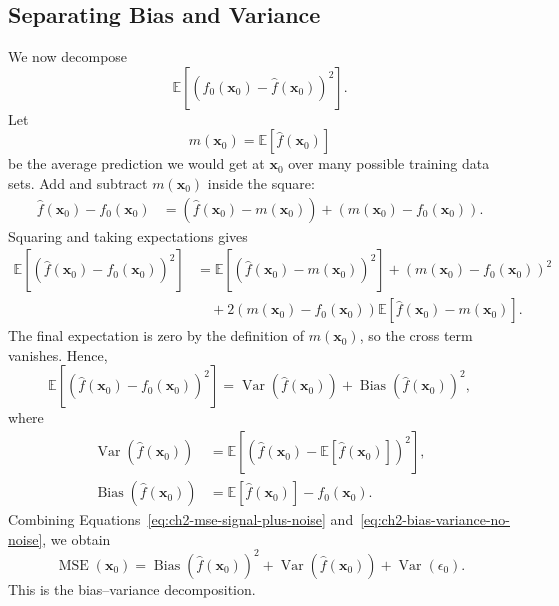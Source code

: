 {\subsection{Separating Bias and Variance}

We now decompose
\[
  \mathbb{E}\left[\left(f_0(\mathbf{x}_0)-\hat f(\mathbf{x}_0)\right)^2\right].
\]
Let
\[
  m(\mathbf{x}_0)=\mathbb{E}\left[\hat f(\mathbf{x}_0)\right]
\]
be the average prediction we would get at $\mathbf{x}_0$ over many possible training data sets.  Add and subtract $m(\mathbf{x}_0)$ inside the square:
\begin{align*}
  \hat f(\mathbf{x}_0)-f_0(\mathbf{x}_0)
  &= \left(\hat f(\mathbf{x}_0)-m(\mathbf{x}_0)\right)
  + \left(m(\mathbf{x}_0)-f_0(\mathbf{x}_0)\right).
\end{align*}
Squaring and taking expectations gives
\begin{align*}
  \mathbb{E}\left[\left(\hat f(\mathbf{x}_0)-f_0(\mathbf{x}_0)\right)^2\right]
  &= \mathbb{E}\left[\left(\hat f(\mathbf{x}_0)-m(\mathbf{x}_0)\right)^2\right]
  + \left(m(\mathbf{x}_0)-f_0(\mathbf{x}_0)\right)^2 \\
  &\quad + 2\left(m(\mathbf{x}_0)-f_0(\mathbf{x}_0)\right)
  \mathbb{E}\left[\hat f(\mathbf{x}_0)-m(\mathbf{x}_0)\right].
\end{align*}
The final expectation is zero by the definition of $m(\mathbf{x}_0)$, so the cross term vanishes.  Hence,
\begin{equation}
  \mathbb{E}\left[\left(\hat f(\mathbf{x}_0)-f_0(\mathbf{x}_0)\right)^2\right]
  = \operatorname{Var}\left(\hat f(\mathbf{x}_0)\right)
  + \operatorname{Bias}\left(\hat f(\mathbf{x}_0)\right)^2,
  \label{eq:ch2-bias-variance-no-noise}
\end{equation}
where
\begin{align}
  \operatorname{Var}\left(\hat f(\mathbf{x}_0)\right)
  &= \mathbb{E}\left[\left(\hat f(\mathbf{x}_0)-\mathbb{E}[\hat f(\mathbf{x}_0)]\right)^2\right],
  \label{eq:ch2-model-variance}\\
  \operatorname{Bias}\left(\hat f(\mathbf{x}_0)\right)
  &= \mathbb{E}\left[\hat f(\mathbf{x}_0)\right]-f_0(\mathbf{x}_0).
  \label{eq:ch2-model-bias}
\end{align}
Combining Equations~\eqref{eq:ch2-mse-signal-plus-noise} and~\eqref{eq:ch2-bias-variance-no-noise}, we obtain
\begin{equation}
  \boxed{
  \operatorname{MSE}(\mathbf{x}_0)
  = \operatorname{Bias}\left(\hat f(\mathbf{x}_0)\right)^2
  + \operatorname{Var}\left(\hat f(\mathbf{x}_0)\right)
  + \operatorname{Var}(\epsilon_0).}
  \label{eq:ch2-bias-variance-final}
\end{equation}
This is the bias--variance decomposition.

}
